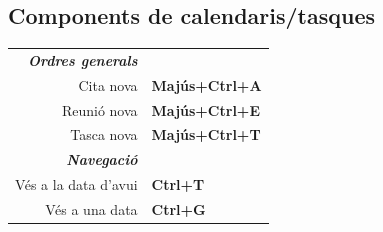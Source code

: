 \documentclass[12pt]{article}
\begin{document}
\begin{landscape}
\begin{center}
\begin{multicols}{2}
	\section*{Components de calendaris/tasques}
	\begin{tabular*}{4in}{rp{1.5in}}
		\textit{\textbf{Ordres generals}}	&					\\
		Cita nova				& \textbf{Majús+Ctrl+A}			\\
		Reunió nova				& \textbf{Majús+Ctrl+E}			\\
		\vspace{1.5mm}
		Tasca nova				& \textbf{Majús+Ctrl+T}			\\
		\textit{\textbf{Navegació}}		&					\\
		Vés a la data d'avui				& \textbf{Ctrl+T}			\\
		Vés a una data				& \textbf{Ctrl+G}			\\
	\end{tabular*}
	\end{multicols}
	\end{center}
	\end{landscape}
 
\end{document}
